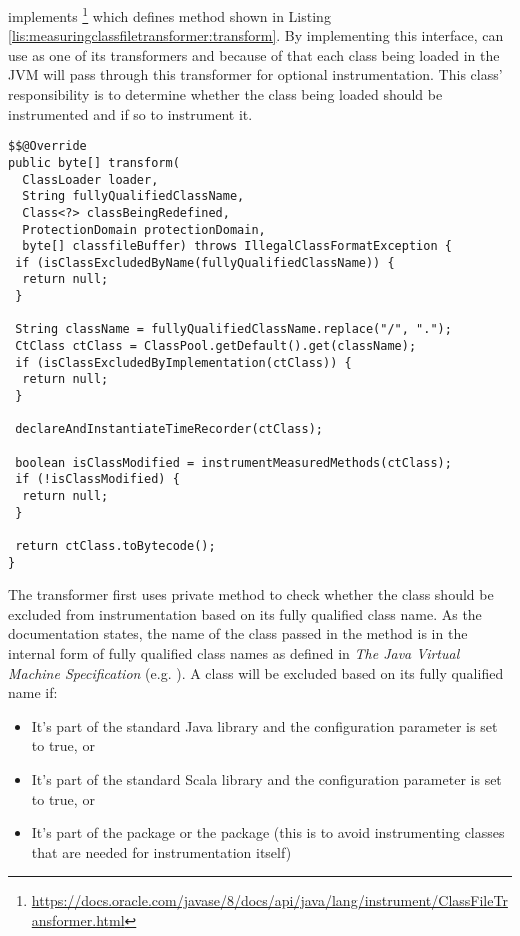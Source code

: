 \noindent {} implements  \footnote{\url{https://docs.oracle.com/javase/8/docs/api/java/lang/instrument/ClassFileTransformer.html}} which defines method  shown in Listing \ref{lis:measuringclassfiletransformer:transform}. By implementing this interface,  can use  as one of its transformers and because of that each class being loaded in the JVM will pass through this transformer for optional instrumentation. This class' responsibility is to determine whether the class being loaded should be instrumented and if so to instrument it.

\begin{lstlisting}[breaklines,caption={$MeasuringClassFileTransformer.transform$ implementation},label=lis:measuringclassfiletransformer:transform]
$$@Override
public byte[] transform(
  ClassLoader loader,
  String fullyQualifiedClassName,
  Class<?> classBeingRedefined,
  ProtectionDomain protectionDomain,
  byte[] classfileBuffer) throws IllegalClassFormatException {
 if (isClassExcludedByName(fullyQualifiedClassName)) {
  return null;
 }

 String className = fullyQualifiedClassName.replace("/", ".");
 CtClass ctClass = ClassPool.getDefault().get(className);
 if (isClassExcludedByImplementation(ctClass)) {
  return null;
 }

 declareAndInstantiateTimeRecorder(ctClass);

 boolean isClassModified = instrumentMeasuredMethods(ctClass);
 if (!isClassModified) {
  return null;
 }

 return ctClass.toBytecode();
}
\end{lstlisting}


\noindent The transformer first uses private method  to check whether the class should be excluded from instrumentation based on its fully qualified class name. As the documentation states, the name of the class passed in the method is in the internal form of fully qualified class names as defined in \textit{The Java Virtual Machine Specification} (e.g. ). A class will be excluded based on its fully qualified name if:
\begin{itemize}
  \item It's part of the standard Java library and the  configuration parameter is set to true, or
  \item It's part of the standard Scala library and the  configuration parameter is set to true, or
  \item It's part of the  package or the  package (this is to avoid instrumenting classes that are needed for instrumentation itself)
\end{itemize}

